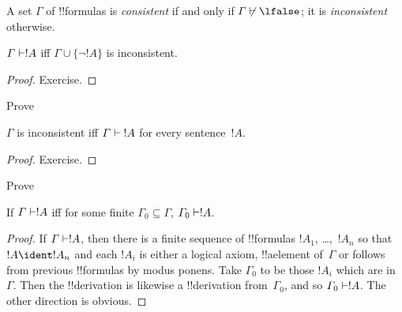 \documentclass[../../include/open-logic-section]{subfiles}
\begin{document}
\begin{defn}[Consistency]
A set $\Gamma$ of !!{formula}s is \emph{consistent} if and only if
$\Gamma\Proves/ \lfalse$; it is \emph{inconsistent} otherwise.
\end{defn}

\begin{prop} 
$\Gamma \Proves !A$ iff $\Gamma \cup \{\lnot !A\}$ is inconsistent.
\end{prop}

\begin{proof}
Exercise.
\end{proof}

\begin{prob}
Prove 
\end{prob}

\begin{prop}
$\Gamma$ is inconsistent iff $\Gamma \Proves {!A}$ for every
  sentence~$!A$.
\end{prop}

\begin{proof}
Exercise.
\end{proof}

\begin{prob}
Prove 
\end{prob}

\begin{prop}
If $\Gamma \Proves !A$ iff for some finite $\Gamma_0 \subseteq
\Gamma$, $\Gamma_0 \Proves !A$.
\end{prop}

\begin{proof}
If $\Gamma \Proves !A$, then there is a finite sequence of
!!{formula}s $!A_1$, \dots,~$!A_n$ so that $!A \ident !A_n$ and each
$!A_i$ is either a logical axiom, !!a{element} of~$\Gamma$ or follows
from previous !!{formula}s by modus ponens.  Take $\Gamma_0$ to be
those $!A_i$ which are in~$\Gamma$.  Then the !!{derivation} is
likewise a !!{derivation} from~$\Gamma_0$, and so $\Gamma_0 \Proves
!A$.  The other direction is obvious.
\end{proof}
\end{document}
